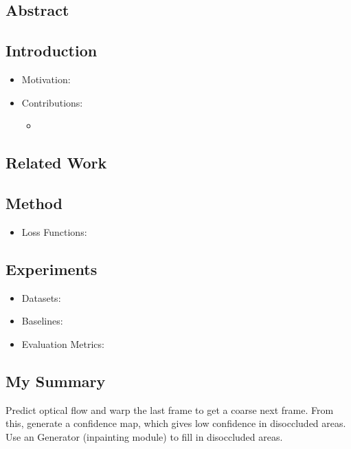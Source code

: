\documentclass{article}
\begin{document}
    \subsection*{Abstract}

    \subsection{Introduction}\label{subsec:Disentangling_Propagation_and_Generation_for_Video_Prediction:introduction}
    \begin{itemize}
        \item Motivation:
        \item Contributions:
        \begin{itemize}
            \item
        \end{itemize}
    \end{itemize}

    \subsection{Related Work}\label{subsec:Disentangling_Propagation_and_Generation_for_Video_Prediction:related-work}

    \subsection{Method}\label{subsec:Disentangling_Propagation_and_Generation_for_Video_Prediction:method}
    \begin{itemize}
        \item Loss Functions:
    \end{itemize}

    \subsection{Experiments}\label{subsec:Disentangling_Propagation_and_Generation_for_Video_Prediction:experiments}
    \begin{itemize}
        \item Datasets:
        \item Baselines:
        \item Evaluation Metrics:
    \end{itemize}

    \subsection{My Summary}\label{subsec:Disentangling_Propagation_and_Generation_for_Video_Prediction:my-summary}
    Predict optical flow and warp the last frame to get a coarse next frame.
    From this, generate a confidence map, which gives low confidence in disoccluded areas.
    Use an Generator (inpainting module) to fill in disoccluded areas.
    \newpage
\end{document}
